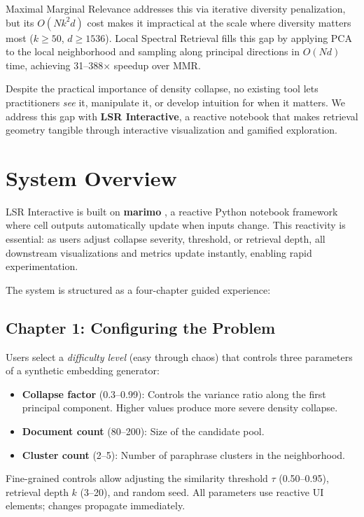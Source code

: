 \documentclass[11pt]{article}
\begin{document}
Maximal Marginal Relevance \citep[MMR;][]{carbonell1998mmr} addresses this via iterative diversity penalization, but its $O(Nk^2d)$ cost makes it impractical at the scale where diversity matters most ($k \geq 50$, $d \geq 1536$). Local Spectral Retrieval \citep[LSR;][]{cossette2026lsr} fills this gap by applying PCA to the local neighborhood and sampling along principal directions in $O(Nd)$ time, achieving 31--388$\times$ speedup over MMR.

Despite the practical importance of density collapse, no existing tool lets practitioners \emph{see} it, manipulate it, or develop intuition for when it matters. We address this gap with \textbf{LSR Interactive}, a reactive notebook that makes retrieval geometry tangible through interactive visualization and gamified exploration.

\section{System Overview}

LSR Interactive is built on \textbf{marimo} \citep{marimo2024}, a reactive Python notebook framework where cell outputs automatically update when inputs change. This reactivity is essential: as users adjust collapse severity, threshold, or retrieval depth, all downstream visualizations and metrics update instantly, enabling rapid experimentation.

The system is structured as a four-chapter guided experience:

\subsection{Chapter 1: Configuring the Problem}

Users select a \emph{difficulty level} (easy through chaos) that controls three parameters of a synthetic embedding generator:

\begin{itemize}
    \item \textbf{Collapse factor} (0.3--0.99): Controls the variance ratio along the first principal component. Higher values produce more severe density collapse.
    \item \textbf{Document count} (80--200): Size of the candidate pool.
    \item \textbf{Cluster count} (2--5): Number of paraphrase clusters in the neighborhood.
\end{itemize}

Fine-grained controls allow adjusting the similarity threshold $\tau$ (0.50--0.95), retrieval depth $k$ (3--20), and random seed. All parameters use reactive UI elements; changes propagate immediately.
\end{document}
